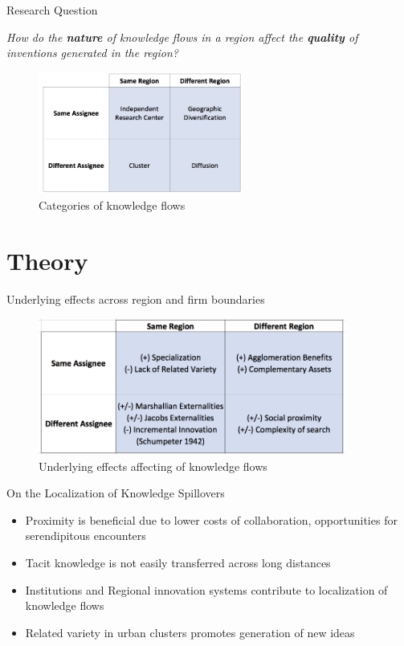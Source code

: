 \documentclass{beamer}
\begin{document}
\begin{frame}{Research Question}{}

\textit{How do the \textbf{nature} of knowledge flows in a region affect the \textbf{quality} of inventions generated in the region?}
\begin{figure}[h!]
\begin{centering}
  \includegraphics[width=0.6\textwidth]{2x2old}
  \caption{Categories of knowledge flows}
   \label{fig:2x2old}
\end{centering}
\end{figure}
\end{frame}

\section{Theory}

\begin{frame}{Underlying effects across region and firm boundaries}
\begin{figure}[h!]
\begin{centering}
  \includegraphics[width=0.9\textwidth]{2x2effects}
  \caption{Underlying effects affecting of knowledge flows}
   \label{fig:2x2effects}
\end{centering}
\end{figure}
\end{frame}

\begin{frame}{On the Localization of Knowledge Spillovers}{}
\begin{itemize}
\item{Proximity is beneficial due to lower costs of collaboration, opportunities for serendipitous encounters}
\item{Tacit knowledge is not easily transferred across long distances}
\item{Institutions and Regional innovation systems contribute to localization of knowledge flows}
\item{Related variety \citep*{Boschma2009, Frenken2007, Jacobs1969} in urban clusters promotes generation of new ideas}
\end{itemize}
\end{frame}
\end{document}
